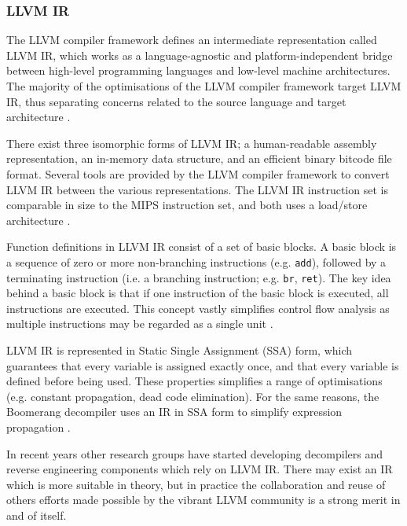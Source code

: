 
\subsubsection{LLVM IR}
\label{sec:lit_review_llvm_ir}

The LLVM compiler framework defines an intermediate representation called LLVM IR, which works as a language-agnostic and platform-independent bridge between high-level programming languages and low-level machine architectures. The majority of the optimisations of the LLVM compiler framework target LLVM IR, thus separating concerns related to the source language and target architecture \cite{llvm_architecture}.

There exist three isomorphic forms of LLVM IR; a human-readable assembly representation, an in-memory data structure, and an efficient binary bitcode file format. Several tools are provided by the LLVM compiler framework to convert LLVM IR between the various representations. The LLVM IR instruction set is comparable in size to the MIPS instruction set, and both uses a load/store architecture \cite{mips_ref,llvm_lang_ref}.

Function definitions in LLVM IR consist of a set of basic blocks. A basic block is a sequence of zero or more non-branching instructions (e.g. \texttt{add}), followed by a terminating instruction (i.e. a branching instruction; e.g. \texttt{br}, \texttt{ret}). The key idea behind a basic block is that if one instruction of the basic block is executed, all instructions are executed. This concept vastly simplifies control flow analysis as multiple instructions may be regarded as a single unit \cite{decomp_of_llvm}.

LLVM IR is represented in Static Single Assignment (SSA) form, which guarantees that every variable is assigned exactly once, and that every variable is defined before being used. These properties simplifies a range of optimisations (e.g. constant propagation, dead code elimination). For the same reasons, the Boomerang decompiler uses an IR in SSA form to simplify expression propagation \cite{ssa_for_decomp}.

In recent years other research groups have started developing decompilers \cite{decomp_of_llvm,retargetable_decomp} and reverse engineering components \cite{mcsema} which rely on LLVM IR. There may exist an IR which is more suitable in theory, but in practice the collaboration and reuse of others efforts made possible by the vibrant LLVM community is a strong merit in and of itself.

